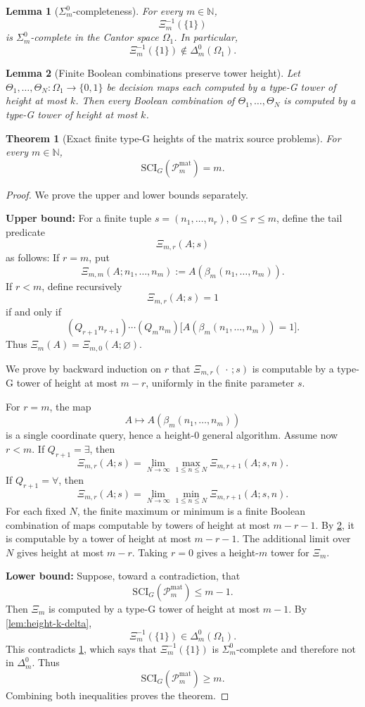 \documentclass[10pt,a4paper]{amsart}
\newtheorem{lemma}{Lemma}
\newtheorem{theorem}{Theorem}
\begin{document}
\begin{lemma}[\(\Sigma^0_m\)-completeness]\label{lem:Xi-m-complete}
For every \(m\in \mathbb{N}\),
\[
\Xi_m^{-1}(\{1\})
\]
is \(\Sigma^0_m\)-complete in the Cantor space \(\Omega_1\). In particular,
\[
\Xi_m^{-1}(\{1\})\notin\Delta^0_m(\Omega_1).
\]
\end{lemma}

\begin{lemma}[Finite Boolean combinations preserve tower height]\label{lem:boolean-combinations-same-height}
Let \(\Theta_1,\ldots,\Theta_N:\Omega_1\to\{0,1\}\) be decision maps each computed by a type-G tower of height at most \(k\). Then every Boolean combination of \(\Theta_1,\ldots,\Theta_N\) is computed by a type-G tower of height at most \(k\).
\end{lemma}

\begin{theorem}[Exact finite type-G heights of the matrix source problems]\label{thm:Xi-m-exact-height}
For every \(m\in \mathbb{N}\),
\[
\mathrm{SCI}_G(\mathcal P_m^{\mathrm{mat}})=m.
\]
\end{theorem}

\begin{proof}
We prove the upper and lower bounds separately.

\smallskip
\noindent\textbf{Upper bound:}
For a finite tuple \(s=(n_1,\ldots,n_r)\), \(0\le r\le m\), define the tail predicate
\[
\Xi_{m,r}(A;s)
\]
as follows: If \(r=m\), put
\[
\Xi_{m,m}(A;n_1,\ldots,n_m) := A(\beta_m(n_1,\ldots,n_m)).
\]
If \(r<m\), define recursively
\[
\Xi_{m,r}(A;s)=1
\]
if and only if
\[
(Q_{r+1} n_{r+1})\cdots(Q_m n_m) \bigl[A(\beta_m(n_1,\ldots,n_m))=1\bigr].
\]
Thus \(\Xi_m(A)=\Xi_{m,0}(A;\varnothing)\).

We prove by backward induction on \(r\) that \(\Xi_{m,r}(\,\cdot\,;s)\) is computable by a type-G tower of height at most \(m-r\), uniformly in the finite parameter \(s\).

For \(r=m\), the map
\[
A\mapsto A(\beta_m(n_1,\ldots,n_m))
\]
is a single coordinate query, hence a height-\(0\) general algorithm. Assume now \(r<m\). If \(Q_{r+1}=\exists\), then
\[
\Xi_{m,r}(A;s) = \lim_{N\to\infty} \max_{1\le n\le N}\Xi_{m,r+1}(A;s,n).
\]
If \(Q_{r+1}=\forall\), then
\[
\Xi_{m,r}(A;s) = \lim_{N\to\infty} \min_{1\le n\le N}\Xi_{m,r+1}(A;s,n).
\]
For each fixed \(N\), the finite maximum or minimum is a finite Boolean combination of maps computable by towers of height at most \(m-r-1\). By \cref{lem:boolean-combinations-same-height}, it is computable by a tower of height at most \(m-r-1\). The additional limit over \(N\) gives height at most \(m-r\). Taking \(r=0\) gives a height-\(m\) tower for \(\Xi_m\).

\smallskip
\noindent\textbf{Lower bound:}
Suppose, toward a contradiction, that
\[
\mathrm{SCI}_G(\mathcal P_m^{\mathrm{mat}})\le m-1.
\]
Then \(\Xi_m\) is computed by a type-G tower of height at most \(m-1\). By \cref{lem:height-k-delta},
\[
\Xi_m^{-1}(\{1\})\in\Delta^0_m(\Omega_1).
\]
This contradicts \cref{lem:Xi-m-complete}, which says that \(\Xi_m^{-1}(\{1\})\) is \(\Sigma^0_m\)-complete and therefore not in \(\Delta^0_m\).
Thus
\[
\mathrm{SCI}_G(\mathcal P_m^{\mathrm{mat}})\ge m.
\]
Combining both inequalities proves the theorem.
\end{proof}
\end{document}
